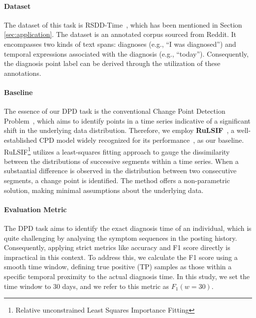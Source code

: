 \paragraph{Dataset} The dataset of this task is RSDD-Time~\cite{macavaney-etal-2018-rsdd}, which has been mentioned in Section \ref{sec:application}. 
The dataset is an annotated corpus sourced from Reddit.  It encompasses two kinds of text spans: diagnoses (e.g., ``I was diagnosed'') and temporal expressions associated with the diagnosis (e.g., ``today''). Consequently, the diagnosis point label can be derived through the utilization of these annotations.


\paragraph{Baseline} 
The essence of our DPD task is the conventional Change Point Detection
Problem~\cite{Truong2020SelectiveRO}, which aims to identify points in a time series indicative of a significant shift in the underlying data distribution. Therefore, we employ \textbf{RuLSIF}~\cite{Liu2013Change}, a well-established CPD model widely recognized for its performance~\cite{hushchyn2021generalization}, as our baseline. RuLSIF\footnote{Relative unconstrained Least Squares Importance Fitting} 
utilizes a least-squares fitting approach to gauge the dissimilarity between the distributions of successive segments within a time series. When a substantial difference is observed in the distribution between two consecutive segments, a change point is identified. The method offers a non-parametric solution, making minimal assumptions about the underlying data.

\paragraph{Evaluation Metric}
The DPD task aims to identify the exact diagnosis time of an individual, which is quite challenging by analysing the symptom sequences in the posting history. Consequently, applying strict metrics like accuracy and F1 score directly is impractical in this context. To address this, we calculate the F1 score using a smooth time window, defining true positive (TP) samples as those within a specific temporal proximity to the actual diagnosis time. In this study, we set the time window to 30 days, and we refer to this metric as \textbf{$F_1(w=30)$}.

